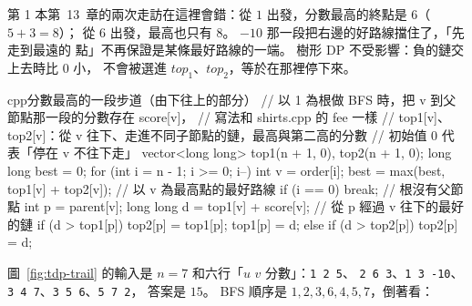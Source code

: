 \begin{center}
\label{fig:tdp-trail}
\end{center}

第 1 本第~13~章的兩次走訪在這裡會錯：從 $1$ 出發，分數最高的終點是 $6$（$5 + 3 = 8$）；
從 $6$ 出發，最高也只有 $8$。 $-10$ 那一段把右邊的好路線擋住了，「先走到最遠的
點」不再保證是某條最好路線的一端。 樹形 DP 不受影響：負的鏈交上去時比 $0$ 小，
不會被選進 $\mathit{top}_1$、$\mathit{top}_2$，等於在那裡停下來。

\begin{code}{cpp}{分數最高的一段步道（由下往上的部分）}
// 以 1 為根做 BFS 時，把 v 到父節點那一段的分數存在 score[v]，
// 寫法和 shirts.cpp 的 fee 一樣
// top1[v]、top2[v]：從 v 往下、走進不同子節點的鏈，最高與第二高的分數
// 初始值 0 代表「停在 v 不往下走」
vector<long long> top1(n + 1, 0), top2(n + 1, 0);
long long best = 0;
for (int i = n - 1; i >= 0; i--) {
    int v = order[i];
    best = max(best, top1[v] + top2[v]);    // 以 v 為最高點的最好路線
    if (i == 0) {
        break;                              // 根沒有父節點
    }
    int p = parent[v];
    long long d = top1[v] + score[v];       // 從 p 經過 v 往下的最好的鏈
    if (d > top1[p]) {
        top2[p] = top1[p];
        top1[p] = d;
    } else if (d > top2[p]) {
        top2[p] = d;
    }
}
\end{code}

圖~\ref{fig:tdp-trail} 的輸入是 $n = 7$ 和六行「$u$ $v$ 分數」：\texttt{1 2 5}、
\texttt{2 6 3}、\texttt{1 3 -10}、\texttt{3 4 7}、\texttt{3 5 6}、\texttt{5 7 2}，
答案是 $15$。 BFS 順序是 $1, 2, 3, 6, 4, 5, 7$，倒著看：

